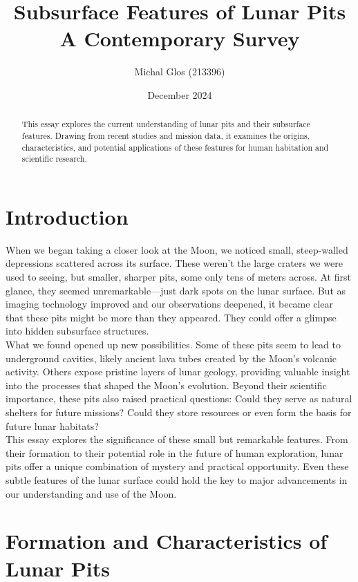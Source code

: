 \documentclass[12pt]{article}
\title{\textbf{Subsurface Features of Lunar Pits} \\ 
A Contemporary Survey}
\author{Michal Glos (213396)}
\date{December 2024}
\begin{document}
\maketitle

\begin{abstract}
This essay explores the current understanding of lunar pits and their subsurface features. Drawing from recent studies and mission data, it examines the origins, characteristics, and potential applications of these features for human habitation and scientific research.
\end{abstract}

\section{Introduction}

When we began taking a closer look at the Moon, we noticed small, steep-walled depressions scattered across its surface. These weren’t the large craters we were used to seeing, but smaller, sharper pits, some only tens of meters across. At first glance, they seemed unremarkable—just dark spots on the lunar surface. But as imaging technology improved and our observations deepened, it became clear that these pits might be more than they appeared. They could offer a glimpse into hidden subsurface structures. \\

What we found opened up new possibilities. Some of these pits seem to lead to underground cavities, likely ancient lava tubes created by the Moon’s volcanic activity. Others expose pristine layers of lunar geology, providing valuable insight into the processes that shaped the Moon’s evolution. Beyond their scientific importance, these pits also raised practical questions: Could they serve as natural shelters for future missions? Could they store resources or even form the basis for future lunar habitats? \\

This essay explores the significance of these small but remarkable features. From their formation to their potential role in the future of human exploration, lunar pits offer a unique combination of mystery and practical opportunity. Even these subtle features of the lunar surface could hold the key to major advancements in our understanding and use of the Moon.

\newpage
\section{Formation and Characteristics of Lunar Pits}
\end{document}
